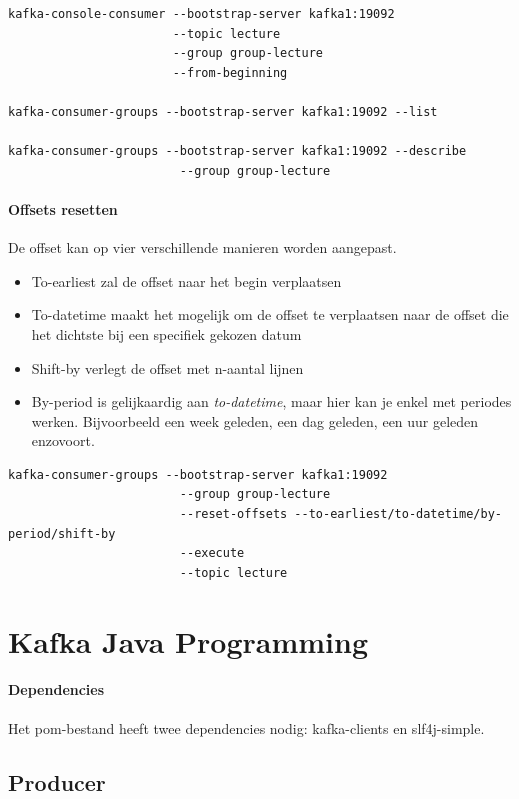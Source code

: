\documentclass[a4paper,10pt,twoside]{report}
\begin{document}
\begin{lstlisting}[language=CLI-kafka]
kafka-console-consumer --bootstrap-server kafka1:19092
					   --topic lecture
					   --group group-lecture
					   --from-beginning
					   
kafka-consumer-groups --bootstrap-server kafka1:19092 --list

kafka-consumer-groups --bootstrap-server kafka1:19092 --describe
						--group group-lecture
\end{lstlisting}

\subsubsection{Offsets resetten}

De offset kan op vier verschillende manieren worden aangepast.

\begin{itemize}
	\item To-earliest zal de offset naar het begin verplaatsen
	\item To-datetime maakt het mogelijk om de offset te verplaatsen naar de offset die het dichtste bij een specifiek gekozen datum 
	\item Shift-by verlegt de offset met n-aantal lijnen
	\item By-period is gelijkaardig aan \textit{to-datetime}, maar hier kan je enkel met periodes werken. Bijvoorbeeld een week geleden, een dag geleden, een uur geleden enzovoort.
\end{itemize}

\begin{lstlisting}[language=CLI-kafka]
kafka-consumer-groups --bootstrap-server kafka1:19092
						--group group-lecture
						--reset-offsets --to-earliest/to-datetime/by-period/shift-by
						--execute
						--topic lecture
\end{lstlisting}

\chapter{Kafka Java Programming}

\subsubsection{Dependencies}

Het pom-bestand heeft twee dependencies nodig: kafka-clients en slf4j-simple.

\section{Producer}
\end{document}
